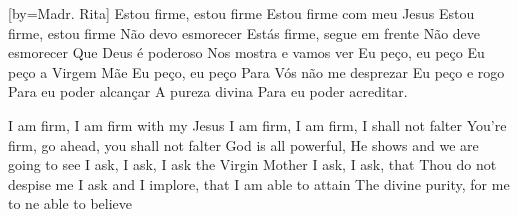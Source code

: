 %
%
\setcounter{songnum}{1}


[by={Madr. Rita}]
  \beginchorus
    Estou firme, estou firme
    Estou firme com meu Jesus
  \endchorus\glueverses\beginchorus
    Estou firme, estou firme
    Não devo esmorecer
  \endchorus
  \beginchorus
    Estás firme, segue em frente
    Não deve esmorecer
  \endchorus\glueverses\beginchorus
    Que Deus é poderoso
    Nos mostra e vamos ver
  \endchorus
  \beginchorus
    Eu peço, eu peço
    Eu peço a Virgem Mãe
  \endchorus\glueverses\beginchorus
    Eu peço, eu peço
    Para Vós não me desprezar
  \endchorus
  \beginchorus
    Eu peço e rogo
    Para eu poder alcançar
  \endchorus\glueverses\beginchorus
    A pureza divina
    Para eu poder acreditar.
  \endchorus
  \begin{translation}[EN]
    I am firm, I am firm with my Jesus
    I am firm, I am firm, I shall not falter
    \nextverse
    You're firm, go ahead, you shall not falter
    God is all powerful, He shows and we are going to see
    \nextverse
    I ask, I ask, I ask the Virgin Mother
    I ask, I ask, that Thou do not despise me
    \nextverse
    I ask and I implore, that I am able to attain
    The divine purity, for me to ne able to believe
  \end{translation}
\endsong


